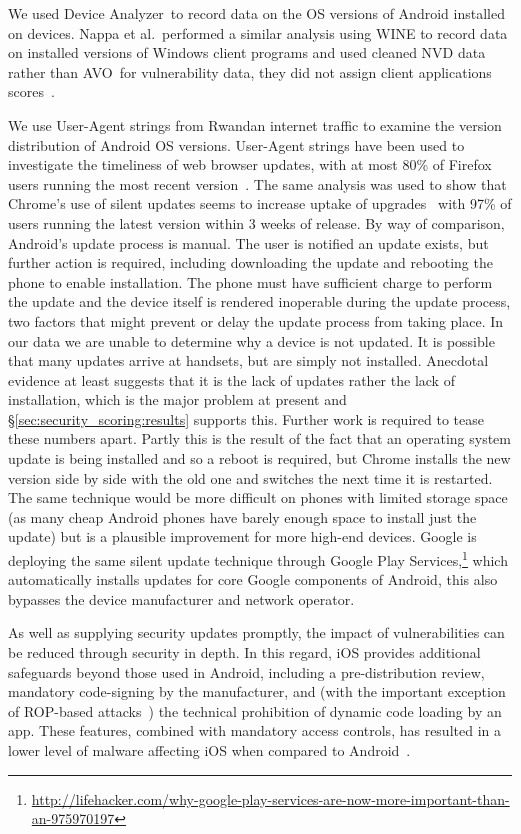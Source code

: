 \documentclass{sig-alternate-2013}
\newcommand{\da}{Device Analyzer}
\newcommand{\avo}{AVO}
\begin{document}
We used \da\ to record data on the OS versions of Android installed on devices.
Nappa et al.\ performed a similar analysis using WINE to record data on installed versions of Windows client programs and used cleaned NVD data rather than \avo\ for vulnerability data, they did not assign client applications scores~\cite{Nappa2015}.


We use User-Agent strings from Rwandan internet traffic to examine the version distribution of Android OS versions.
User-Agent strings have been used to investigate the timeliness of web browser updates, with at most 80\% of Firefox users running the most recent version~\cite{Frei2008}.
The same analysis was used to show that Chrome's use of silent updates seems to increase uptake of upgrades~\cite{Duebendorfer2010} with 97\% of users running the latest version within 3 weeks of release.
By way of comparison, Android's update process is manual.
The user is notified an update exists, but further action is required, including downloading the update and rebooting the phone to enable installation.
The phone must have sufficient charge to perform the update and the device itself is rendered inoperable during the update process, two factors that might prevent or delay the update process from taking place.
In our data we are unable to determine why a device is not updated. 
It is possible that many updates arrive at handsets, but are simply not installed.
Anecdotal evidence at least suggests that it is the lack of updates rather the lack of installation, which is the major problem at present and \S\ref{sec:security_scoring:results} supports this. Further work is required to tease these numbers apart.
Partly this is the result of the fact that an operating system update is being installed and so a reboot is required, but Chrome installs the new version side by side with the old one and switches the next time it is restarted.
The same technique would be more difficult on phones with limited storage space (as many cheap Android phones have barely enough space to install just the update) but is a plausible improvement for more high-end devices.
Google is deploying the same silent update technique through Google Play Services,\footnote{\href{http://lifehacker.com/why-google-play-services-are-now-more-important-than-an-975970197}{http://lifehacker.com/why-google-play-services-are-now-more-important-than-an-975970197}} which automatically installs updates for core Google components of Android, this also bypasses the device manufacturer and network operator.

As well as supplying security updates promptly, the impact of vulnerabilities can be reduced through security in depth.
In this regard, iOS provides additional safeguards beyond those used in Android, including a pre-distribution review, mandatory code-signing by the manufacturer, and (with the important exception of ROP-based attacks~\cite{Wang2013a}) the technical prohibition of dynamic code loading by an app.
These features, combined with mandatory access controls, has resulted in a lower level of malware affecting iOS when compared to Android~\cite{Felt2011}.
\end{document}
